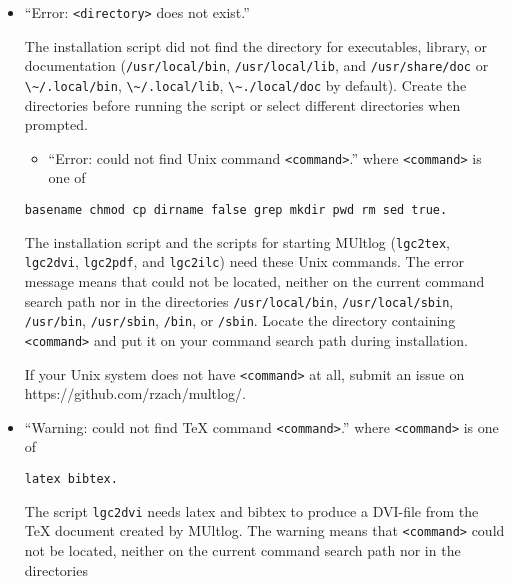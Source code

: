 \documentclass[]{article}
\newcommand{\passthrough}[1]{#1}
\providecommand{\tightlist}{%
  \setlength{\itemsep}{0pt}\setlength{\parskip}{0pt}}
\begin{document}
\begin{itemize}
\item
  ``Error: \passthrough{\lstinline!<directory>!} does not exist.''

  The installation script did not find the directory for executables,
  library, or documentation (\passthrough{\lstinline!/usr/local/bin!},
  \passthrough{\lstinline!/usr/local/lib!}, and
  \passthrough{\lstinline!/usr/share/doc!} or
  \passthrough{\lstinline!\~/.local/bin!},
  \passthrough{\lstinline!\~/.local/lib!},
  \passthrough{\lstinline!\~./local/doc!} by default). Create the
  directories before running the script or select different directories
  when prompted.

  \begin{itemize}
  \tightlist
  \item
    ``Error: could not find Unix command
    \passthrough{\lstinline!<command>!}.'' where
    \passthrough{\lstinline!<command>!} is one of
  \end{itemize}

\begin{lstlisting}
basename chmod cp dirname false grep mkdir pwd rm sed true.
\end{lstlisting}

  The installation script and the scripts for starting MUltlog
  (\passthrough{\lstinline!lgc2tex!}, \passthrough{\lstinline!lgc2dvi!},
  \passthrough{\lstinline!lgc2pdf!}, and
  \passthrough{\lstinline!lgc2ilc!}) need these Unix commands. The error
  message means that could not be located, neither on the current
  command search path nor in the directories
  \passthrough{\lstinline!/usr/local/bin!},
  \passthrough{\lstinline!/usr/local/sbin!},
  \passthrough{\lstinline!/usr/bin!},
  \passthrough{\lstinline!/usr/sbin!}, \passthrough{\lstinline!/bin!},
  or \passthrough{\lstinline!/sbin!}. Locate the directory containing
  \passthrough{\lstinline!<command>!} and put it on your command search
  path during installation.

  If your Unix system does not have \passthrough{\lstinline!<command>!}
  at all, submit an issue on https://github.com/rzach/multlog/.
\item
  ``Warning: could not find TeX command
  \passthrough{\lstinline!<command>!}.'' where
  \passthrough{\lstinline!<command>!} is one of

\begin{lstlisting}
latex bibtex.
\end{lstlisting}

  The script \passthrough{\lstinline!lgc2dvi!} needs latex and bibtex to
  produce a DVI-file from the TeX document created by MUltlog. The
  warning means that \passthrough{\lstinline!<command>!} could not be
  located, neither on the current command search path nor in the
  directories


\end{itemize}
\end{document}
